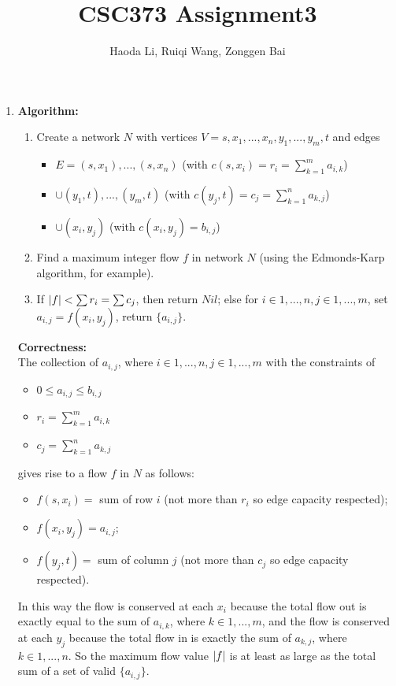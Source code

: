 \documentclass[11pt]{article}
\title{CSC373 Assignment3}
\author{Haoda Li, Ruiqi Wang, Zonggen Bai}
\begin{document}
\maketitle
\begin{enumerate}
    \item
    \textbf{Algorithm:}\\
    \begin{enumerate}
        \item Create a network $N$ with vertices $V = {s, x_1, ..., x_n, y_1, ..., y_m, t}$ and edges
        \begin{itemize}
            \item $E={(s,x_1),...,(s,x_n)}$ (with $c(s,x_i)=r_i=\sum_{k=1}^{m} a_{i,k}$)
            \item $\cup {(y_1, t),...,(y_m, t)}$ (with $c(y_j, t)=c_j=\sum_{k=1}^{n} a_{k,j}$)
            \item $\cup {(x_i, y_j)}$ (with $c(x_i, y_j)=b_{i,j}$)
        \end{itemize}
        \item Find a maximum integer flow $f$ in network $N$ (using the Edmonds-Karp algorithm, for example).
        \item If $\left | f \right | < \sum {r_i} = \sum {c_j}$, then return $Nil$; else for $i \in {1,...,n}, j \in {1,...,m}$, set $a_{i,j} = f(x_i, y_j)$, return $\{a_{i,j}\}$.
    \end{enumerate}
    \textbf{Correctness:}\\
    The collection of $a_{i,j}$, where $i \in {1,...,n}, j \in {1,...,m}$ with the constraints of
    \begin{itemize}
        \item $0 \leq a_{i,j} \leq b_{i,j}$
        \item $r_i=\sum_{k=1}^{m} a_{i,k}$
        \item $c_j=\sum_{k=1}^{n} a_{k,j}$
    \end{itemize}
    gives rise to a flow $f$ in $N$ as follows:
    \begin{itemize}
        \item $f(s,x_i)=$ sum of row $i$ (not more than $r_i$ so edge capacity respected);
        \item $f(x_i, y_j)=a_{i,j}$;
        \item $f(y_j, t)=$ sum of column $j$ (not more than $c_j$ so edge capacity respected).
    \end{itemize}
    In this way the flow is conserved at each $x_i$ because the total flow out is exactly equal to the sum of $a_{i,k}$, where $k\in{1,...,m}$, and the flow is conserved at each $y_j$ because the total flow in is exactly the sum of $a_{k,j}$, where $k\in{1,...,n}$. So the maximum flow value $\left | f \right |$ is at least as large as the total sum of a set of valid $\{a_{i,j}\}$.\\

\end{enumerate}
\end{document}
